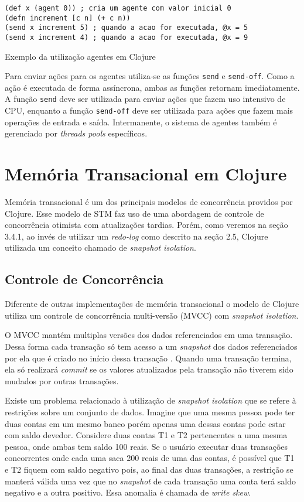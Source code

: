 \begin{listing}
  \begin{verbatim}
(def x (agent 0)) ; cria um agente com valor inicial 0
(defn increment [c n] (+ c n))
(send x increment 5) ; quando a acao for executada, @x = 5
(send x increment 4) ; quando a acao for executada, @x = 9
  \end{verbatim}
  \caption{Exemplo da utilização agentes em Clojure}
\end{listing}

Para enviar ações para os agentes utiliza-se as funções \verb|send| e \verb|send-off|. Como a ação é executada de forma assíncrona, ambas as funções retornam imediatamente. A função \verb|send| deve ser utilizada para enviar ações que fazem uso intensivo de CPU, enquanto a função \verb|send-off| deve ser utilizada para ações que fazem mais operações de entrada e saída. Intermanente, o sistema de agentes também é gerenciado por \emph{threads pools} específicos.


\section{Memória Transacional em Clojure}

Memória transacional é um dos principais modelos de concorrência providos por Clojure. Esse modelo de STM faz uso de uma abordagem de controle de concorrência otimista com atualizações tardias. Porém, como veremos na seção 3.4.1, ao invés de utilizar um \emph{redo-log} como descrito na seção 2.5, Clojure utilizada um conceito chamado de \emph{snapshot isolation}.


\subsection{Controle de Concorrência}

Diferente de outras implementações de memória transacional o modelo de Clojure utiliza um controle de concorrência multi-versão (MVCC) com \emph{snapshot isolation}. \cite{hickey2010clojurerefs}

O MVCC mantém multiplas versões dos dados referenciados em uma transação. Dessa forma cada transação só tem acesso a um \emph{snapshot} dos dados referenciados por ela que é criado no início dessa transação \cite{swinnerton2012clojure}. Quando uma transação termina, ela só realizará \emph{commit} se os valores atualizados pela transação não tiverem sido mudados por outras transações. 

Existe um problema relacionado à utilização de \emph{snapshot isolation} que se refere à restrições sobre um conjunto de dados. Imagine que uma mesma pessoa pode ter duas contas em um mesmo banco porém apenas uma dessas contas pode estar com saldo devedor. Considere duas contas T1 e T2 pertencentes a uma mesma pessoa, onde ambas tem saldo 100 reais. Se o usuário executar duas transações concorrentes onde cada uma saca 200 reais de uma das contas, é possível que T1 e T2 fiquem com saldo negativo pois, ao final das duas transações, a restrição se manterá válida uma vez que no \emph{snapshot} de cada transação uma conta terá saldo negativo e a outra positivo. \cite{wiki2013snapshot} Essa anomalia é chamada de \emph{write skew}.

